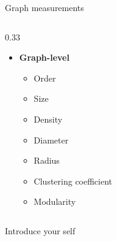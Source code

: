 \documentclass{beamer}
\begin{document}
\begin{frame}{Graph measurements}
\begin{columns}[t]
            \begin{column}{0.33\textwidth}
               \begin{itemize}
                    \item \textbf{Graph-level}
                    \begin{itemize}
                        \item Order
                        \item Size
                        \item Density
                        \item Diameter
                        \item Radius
                        \item Clustering coefficient
                        \item Modularity
                    \end{itemize}
                \end{itemize}
            \end{column}
        \end{columns}

        \begin{note}
            {Introduce your self}
        \end{note}
    \end{frame}
\end{document}
